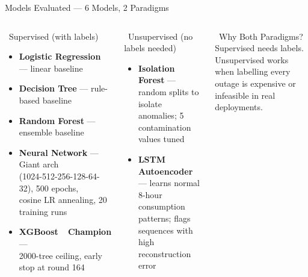 \documentclass[aspectratio=169,10pt]{beamer}
\newcommand{\hl}[1]{\colorbox{AccentTeal!20}{\textcolor{PrimaryBlue}{\textbf{#1}}}}
\begin{document}
\begin{frame}{Models Evaluated --- 6 Models, 2 Paradigms}
\begin{columns}[t]
  \begin{block}{\faTag\ Supervised (with labels)}
    \footnotesize
    \begin{itemize}\setlength\itemsep{3pt}
      \item \textbf{Logistic Regression} --- linear baseline
      \item \textbf{Decision Tree} --- rule-based baseline
      \item \textbf{Random Forest} --- ensemble baseline
      \item \textbf{Neural Network} --- Giant arch\\
            (1024-512-256-128-64-32), 500 epochs,\\
            cosine LR annealing, 20 training runs
      \item \hl{XGBoost\ \faTrophy\ Champion} ---\\
            2000-tree ceiling, early stop at round 164
    \end{itemize}
  \end{block}
  \begin{block}{\faMagic\ Unsupervised (no labels needed)}
    \footnotesize
    \begin{itemize}\setlength\itemsep{3pt}
      \item \textbf{Isolation Forest} --- random splits to isolate anomalies; 5 contamination values tuned
      \item \textbf{LSTM Autoencoder} --- learns normal 8-hour consumption patterns; flags sequences with high reconstruction error
    \end{itemize}
  \end{block}
  \vspace{3pt}
  \begin{exampleblock}{\faInfoCircle\ Why Both Paradigms?}
    \footnotesize
    Supervised needs labels.
    Unsupervised works when labelling every outage is expensive or infeasible in real deployments.
  \end{exampleblock}
\end{columns}
\end{frame}
\end{document}

